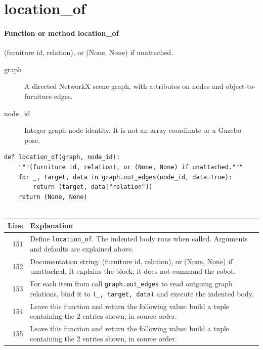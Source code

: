 \documentclass[11pt,a4paper]{book}
\begin{document}
\section{location\_of}

\paragraph{Function or method location\_of}
(furniture id, relation), or (None, None) if unattached.

\begin{description}
\item[graph] A directed NetworkX scene graph, with attributes on nodes and object-to-furniture edges.
\item[node\_id] Integer graph-node identity. It is not an array coordinate or a Gazebo pose.
\end{description}

\begin{lstlisting}[firstnumber=151]
def location_of(graph, node_id):
    """(furniture id, relation), or (None, None) if unattached."""
    for _, target, data in graph.out_edges(node_id, data=True):
        return (target, data["relation"])
    return (None, None)


\end{lstlisting}

\begin{longtable}{r p{}}

\textbf{Line} & \textbf{Explanation} \\ \hline \endhead

151 & Define \texttt{location\_of}. The indented body runs when called. Arguments and defaults are explained above. \\

152 & Documentation string: (furniture id, relation), or (None, None) if unattached. It explains the block; it does not command the robot. \\

153 & For each item from call \texttt{graph.out\_edges} to read outgoing graph relations, bind it to \texttt{(\_, target, data)} and execute the indented body. \\

154 & Leave this function and return the following value: build a tuple containing the 2 entries shown, in source order. \\

155 & Leave this function and return the following value: build a tuple containing the 2 entries shown, in source order. \\

\end{longtable}
\end{document}
